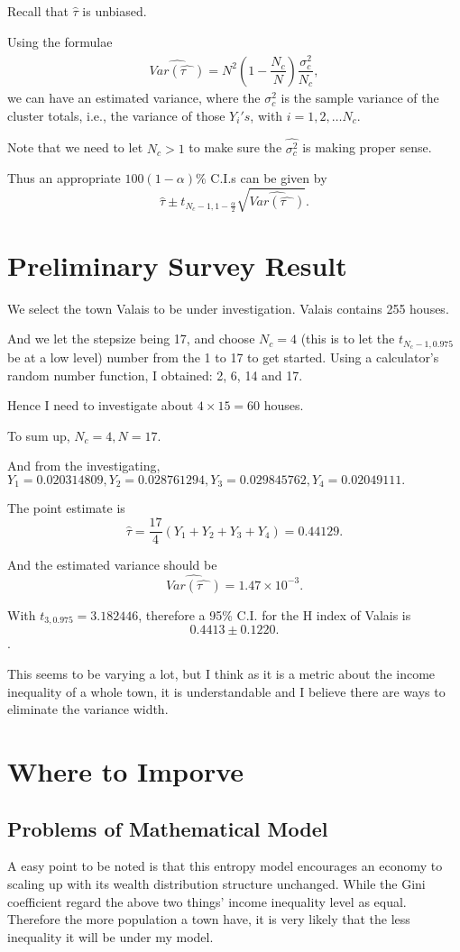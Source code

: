 \documentclass[12pt]{article}%
\begin{document}
Recall that $\hat{\tau}$ is unbiased.

Using the formulae 
$$\hat{Var(\hat{\tau~~~})  }=N^2(1-\frac{N_c}{N})\frac{\hat{\sigma_{c}^2}}{N_c},$$ we can have an estimated variance, where the $\hat{\sigma_{c}^2}$ is the sample variance of the cluster totals, i.e., the variance of those $Y_i's$, with $i=1,2,\dots N_c.$

Note that we need to let $N_c>1$ to make sure the $\hat{\sigma_{c}^2}$ is making proper sense.

Thus an appropriate $100(1-\alpha)\%$ C.I.s can be given by $$\hat{\tau} \pm t_{N_c-1,1-\frac{\alpha}{2}}\sqrt{\hat{Var(\hat{\tau~~~})  }}.$$



\section{Preliminary Survey Result}

We select the town Valais to be under investigation. Valais contains 255 houses.

And we let the stepsize being 17, and choose $N_c=4$ (this is to let the $t_{N_c-1,0.975}$ be at a low level) number from the 1 to 17 to get started.
Using a calculator's random number function, I obtained: 2, 6, 14 and 17.

Hence I need to investigate about $4 \times 15=60$ houses.

To sum up, $N_c=4, N=17.$ 

And from the investigating, $Y_1=0.020314809, Y_2=0.028761294, Y_3=0.029845762, Y_4=0.02049111.$ 

The point estimate is $$\hat{\tau}=\frac{17}{4}(Y_1+Y_2+Y_3+Y_4)=0.44129.$$

And the estimated variance should be $$\hat{Var(\hat{\tau~~~})  }=1.47\times 10^{-3}.$$

With $t_{3,0.975}=3.182446$, therefore a 95\% C.I. for the H index of Valais is $$0.4413 \pm 0.1220.$$.

This seems to be varying a lot, but I think as it is a metric about the income inequality of a whole town, it is understandable and I believe there are ways to eliminate the variance width.



\section{Where to Imporve}

\subsection{Problems of Mathematical Model}
A easy point to be noted is that this entropy model encourages an economy to scaling up with its wealth distribution structure unchanged. 
While the Gini coefficient regard the above two things' income inequality level as equal. Therefore the more population a town have, it is very likely that the less inequality it will be under my model.
\end{document}
